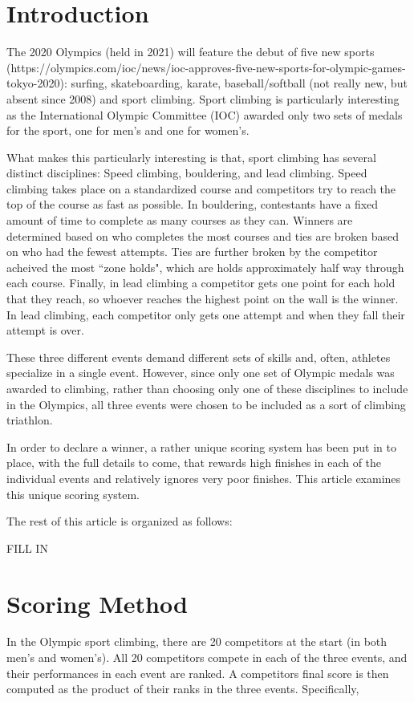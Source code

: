 \documentclass{article}\usepackage[]{graphicx}\usepackage[]{color}
\begin{document}
\section{Introduction}
The 2020 Olympics (held in 2021) will feature the debut of five new sports (https://olympics.com/ioc/news/ioc-approves-five-new-sports-for-olympic-games-tokyo-2020): surfing, skateboarding, karate, baseball/softball (not really new, but absent since 2008) and sport climbing.  Sport climbing is particularly interesting as the International Olympic Committee (IOC) awarded only two sets of medals for the sport, one for men's and one for women's.  

What makes this particularly interesting is that, sport climbing has several distinct disciplines: Speed climbing, bouldering, and lead climbing.  Speed climbing takes place on a standardized course and competitors try to reach the top of the course as fast as possible.  In bouldering, contestants have a fixed amount of time to complete as many courses as they can.  Winners are determined based on who completes the most courses and ties are broken based on who had the fewest attempts.  Ties are further broken by the competitor acheived the most ``zone holds", which are holds approximately half way through each course.  Finally, in lead climbing a competitor gets one point for each hold that they reach, so whoever reaches the highest point on the wall is the winner.  In lead climbing, each competitor only gets one attempt and when they fall their attempt is over.  

These three different events demand different sets of skills and, often, athletes specialize in a single event.  However, since only one set of Olympic medals was awarded to climbing, rather than choosing only one of these disciplines to include in the Olympics, all three events were chosen to be included as a sort of climbing triathlon.  

In order to declare a winner, a rather unique scoring system has been put in to place, with the full details to come, that rewards high finishes in each of the individual events and relatively ignores very poor finishes.  This article examines this unique scoring system. 

The rest of this article is organized as follows: 

FILL IN 

\section{Scoring Method}
In the Olympic sport climbing, there are 20 competitors at the start (in both men's and women's).  All 20 competitors compete in each of the three events, and their performances in each event are ranked.  A competitors final score is then computed as the product of their ranks in the three events.  Specifically, 
\end{document}
